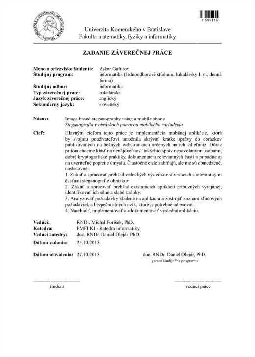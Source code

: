 \documentclass[12pt, oneside]{book}
\begin{document}
\newpage 
\thispagestyle{empty}
\hspace{-2cm}\includegraphics[width=1.1\textwidth]{images/zadanie_sk}
\end{document}
